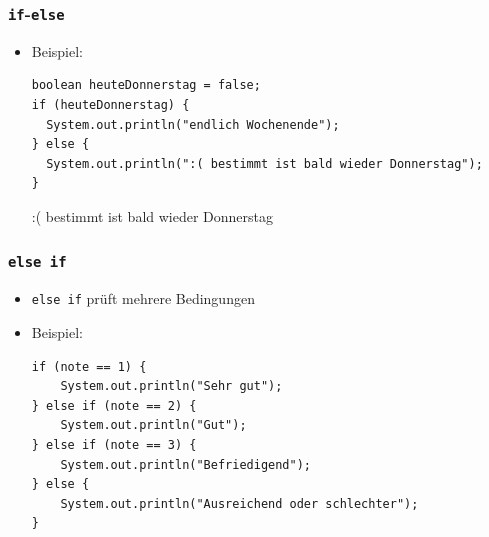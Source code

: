 \documentclass{../../presentation}
\begin{document}
\begin{frame}[fragile]
	\frametitle{\texttt{if}-\texttt{else}}
	\pause
	\begin{itemize}
		\item Beispiel:
		      \begin{verbatim}
boolean heuteDonnerstag = false;
if (heuteDonnerstag) {
  System.out.println("endlich Wochenende");
} else {
  System.out.println(":( bestimmt ist bald wieder Donnerstag");
}
\end{verbatim}
		      \pause
		      \begin{ausgabe}
			      :( bestimmt ist bald wieder Donnerstag
		      \end{ausgabe}
	\end{itemize}
\end{frame}

\begin{frame}[fragile]
	\frametitle{\texttt{else if}}
	\pause
	\begin{itemize}
		\item \texttt{else if} prüft mehrere Bedingungen
		      \pause
		\item Beispiel:
		      \begin{verbatim}
if (note == 1) {
    System.out.println("Sehr gut");
} else if (note == 2) {
    System.out.println("Gut");
} else if (note == 3) {
    System.out.println("Befriedigend");
} else {
    System.out.println("Ausreichend oder schlechter");
}
    \end{verbatim}
	\end{itemize}
\end{frame}

\end{document}
